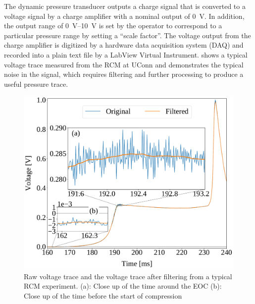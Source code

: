 \documentclass[12pt]{../ussci}
\begin{document}
The dynamic pressure transducer outputs a charge signal that is converted to a
voltage signal by a charge amplifier with a nominal output of \SI{0}{\V}. In
addition, the output range of \SIrange{0}{10}{\V} is set by the operator to
correspond to a particular pressure range by setting a ``scale factor''. The
voltage output from the charge amplifier is digitized by a hardware data
acquisition system (DAQ) and recorded into a plain text file by a LabView
Virtual Instrument.  shows a typical voltage trace
measured from the RCM at UConn and demonstrates the typical noise in the signal,
which requires filtering and further processing to produce a useful pressure
trace.

\begin{figure}[htbp]
    \begin{minipage}[t]{0.48\textwidth}
        \centering
        \includegraphics[width=\linewidth]{figures/raw-voltage.pdf}
        \caption{Raw voltage trace and the voltage trace after filtering from a typical
        RCM experiment. (a): Close up of the
        time around the EOC (b): Close up of the time before the start of
        compression}
        \label{fig:raw-voltage}
    \end{minipage}\hfill%
    \begin{minipage}[t]{0.48\textwidth}
        \centering

\end{minipage}
\end{figure}
\end{document}
